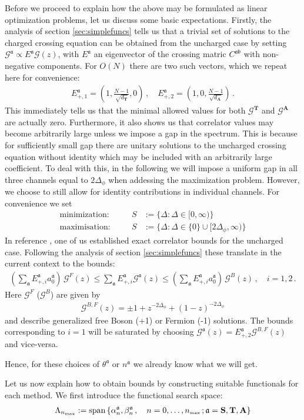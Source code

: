 \documentclass[12pt]{article}
\numberwithin{equation}{section}
\newcommand{\bea}{\begin{eqnarray}}
\newcommand{\eea}{\end{eqnarray}}
\newcommand{\ba}{\begin{equation}\begin{aligned}}
\newcommand{\ea}{\end{aligned}\end{equation}}
\newcommand{\mbf}{\mathbf}
\newcommand{\Df}{{\Delta_\phi}}
\newcommand{\mf}[1]{\mathfrak #1}
\begin{document}
	Before we proceed to explain how the above may be formulated as linear optimization problems, let us discuss some basic expectations. Firstly, the analysis of section 
	\ref{sec:simplefuncs} tells us that a trivial set of solutions to the charged crossing equation can be obtained from the uncharged case by setting $\mathcal G^{\mf a}\propto E^{\mf a} \mathcal G(z)$, with $E^{\mf a}$ an eigenvector of the crossing matric $C^{\mf a\mf b}$ with non-negative components. For $O(N)$ there are two such vectors, which we repeat here for convenience:
	\bea
		E_{+,1}^{\mf a}=\left(1,\frac{N-1}{\sqrt{d_{\mbf T}}},0\right)\,, \quad  E_{+,2}^{\mf a}=\left(1,0,\frac{N-1}{\sqrt{d_{\mbf A}}}\right)\,.
	\eea
	This immediately tells us that the minimal allowed values for both $\mathcal G^{\mbf T}$ and $\mathcal G^{\mbf A}$ are actually zero. Furthermore, it also shows us that correlator values may become arbitrarily large unless we impose a gap in the spectrum. This is because for sufficiently small gap there are unitary solutions to the uncharged crossing equation without identity which may be included with an arbitrarily large coefficient. To deal with this, in the following we will impose a uniform gap in all three channels equal to $2\Df$ when addessing the maximization problem. However, we choose to still allow for identity contributions in individual channels. For convenience we set
	\ba
	\mbox{minimization:}&\quad& S&:=\{\Delta: \Delta\in [0,\infty)\}\\
	\mbox{maximisation:}&\quad& S&:=\{\Delta: \Delta\in \{0\}\cup [2\Df,\infty)\}		
	\ea
	In reference \cite{Paulos:2020zxx}, one of us established exact correlator bounds for the uncharged case. Following the analysis of section \ref{sec:simplefuncs} these translate in the current context to the bounds:
	\bea
\left(\sum_{\mf a} E_{+,i}^{\mf a}a_{0}^{\mf a}\right)\, \mathcal G^{F}(z)\leq	\sum_{\mf a} E_{+,i}^{\mf a} \mathcal G^{\mf a}(z) \leq \left(\sum_{\mf a} E_{+,i}^{\mf a}a_{0}^{\mf a}\right)\, \mathcal G^{B}(z)\,, \quad i=1,2\,.
	\eea
	Here $\mathcal G^F$ ($\mathcal G^B$) are given by%
	\bea
	\mathcal G^{B,F}(z)=\pm 1+z^{-2\Df}+(1-z)^{-2\Df}
	\eea
	and describe generalized free Boson (+1) or Fermion (-1) solutions. The bounds corresponding to $i=1$ will be saturated by choosing $\mathcal G^{\mf a}(z)=E_{+,2}^{\mf a} \mathcal G^{B,F}(z)$ and vice-versa.
	
	Hence, for these choices of $\theta^{\mf a}$ or $n^\mf a$ we already know what we will get.
	
	Let us now explain how to obtain bounds by constructing suitable functionals for each method. We first introduce the functional search space:
	\ba
	\Lambda_{n_{\mbox{\tiny max}}}:=\mbox{span}\left\{ \alpha_n^{\mf a},\beta_n^{\mf a}\,, \quad n=0,\ldots,n_{\mbox{\tiny max}}\,; \mf a=\mbf S, \mbf T,\mbf A\right\}
	\ea
	
\end{document}

